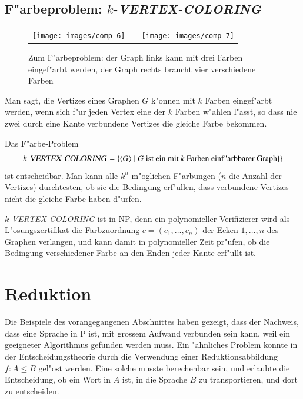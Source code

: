 \subsection{F"arbeproblem: \texorpdfstring{$k$}{k}-\textsl{VERTEX-COLORING}}
\begin{figure}
\begin{center}
\begin{tabular}{ccc}
\texttt{[image: images/comp-6]}&
\qquad&\qquad
\texttt{[image: images/comp-7]}
\end{tabular}
\end{center}
\caption{Zum F"arbeproblem: der Graph links kann mit drei Farben
eingef"arbt werden, der Graph rechts braucht vier verschiedene Farben
\label{vertex-coloring-examples}}
\end{figure}%
Man sagt, die Vertizes eines Graphen $G$ k"onnen mit $k$ Farben
eingef"arbt werden, wenn sich f"ur jeden Vertex eine der $k$ Farben
w"ahlen l"asst, so dass nie zwei durch eine Kante verbundene Vertizes
die gleiche Farbe bekommen.

Das F"arbe-Problem 
\[
\text{$k$-\textsl{VERTEX-COLORING}}
=
\{
\langle G\rangle\;|\;
\text{$G$ ist ein mit $k$ Farben einf"arbbarer Graph}\}
\}
\]
ist entscheidbar. Man kann alle $k^n$ m"oglichen F"arbungen
($n$ die Anzahl der Vertizes) durchtesten, ob sie die Bedingung
erf"ullen, dass verbundene Vertizes nicht die gleiche Farbe haben
d"urfen.

$k$-\textsl{VERTEX-COLORING} ist in NP, denn ein polynomieller Verifizierer
wird als L"osungszertifikat die Farbzuordnung $c=(c_1,\dots,c_n)$ der
Ecken $1,\dots,n$ des Graphen verlangen, und kann damit in polynomieller
Zeit pr"ufen, ob die Bedingung verschiedener Farbe an den Enden
jeder Kante erf"ullt ist.

\section{Reduktion}
Die Beispiele des vorangegangenen Abschnittes haben gezeigt,
dass der Nachweis, dass eine Sprache in P ist, mit grossem
Aufwand verbunden sein kann, weil ein geeigneter Algorithmus
gefunden werden muss. Ein "ahnliches Problem konnte in der
Entscheidungstheorie durch die Verwendung einer Reduktionsabbildung
$f\colon A\le B$
gel"ost werden. Eine solche musste berechenbar sein, und erlaubte
die Entscheidung, ob ein Wort in $A$ ist, in die Sprache
$B$ zu transportieren, und dort zu entscheiden.

